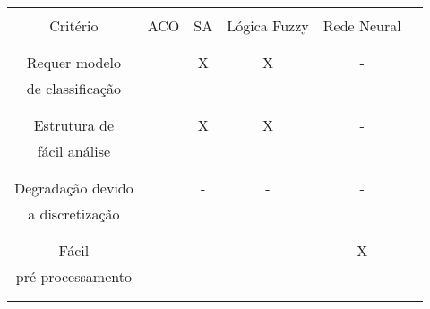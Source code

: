  \begin{table}
   \begin{center}
     \begin{tabular}{|c|c|c|c|c|c|}
       \hline
                         &          &           &              &            \\
       Critério          &  ACO     &    SA     & Lógica Fuzzy & Rede Neural\\
                         &          &           &              &            \\
       \hline
                         &          &           &              &            \\
       Requer modelo     &          &    X      &      X       &      -     \\
       de classificação  &          &           &              &            \\
                         &          &           &              &            \\
       \hline
                         &          &           &              &            \\
       Estrutura de      &          &    X      &      X       &      -     \\
       fácil análise     &          &           &              &            \\
                         &          &           &              &            \\
       \hline
                         &          &           &              &            \\
       Degradação devido &          &    -      &      -       &      -     \\
       a discretização   &          &           &              &            \\
                         &          &           &              &            \\
       \hline
                         &          &           &              &            \\
       Fácil             &          &    -      &      -       &      X     \\
       pré-processamento &          &           &              &            \\
                         &          &           &              &            \\
       \hline
                         &          &           &              &            \\

\end{tabular}
\end{center}
\end{table}
